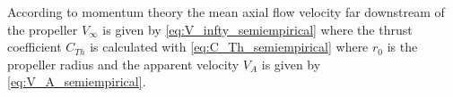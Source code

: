 According to momentum theory the mean axial flow velocity far downstream of the propeller $V_{\infty}$ is given by \autoref{eq:V_infty_semiempirical} \cite{brix_manoeuvring_1993} where the thrust coefficient $C_{Th}$ is calculated with \autoref{eq:C_Th_semiempirical} where $r_0$ is the propeller radius and the apparent velocity $V_A$ is given by \autoref{eq:V_A_semiempirical}.
\begin{equation}
    \label{eq:V_infty_semiempirical}
    
\end{equation}
%
\begin{equation}
    \label{eq:C_Th_semiempirical}
    
\end{equation}
%
\begin{equation}
    \label{eq:V_A_semiempirical}
    
\end{equation}

